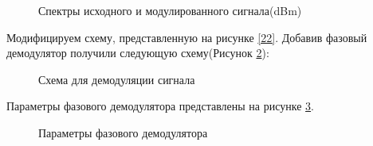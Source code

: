 \documentclass[a4paper,14pt]{extarticle}
\begin{document}
\begin{figure}[H]
\caption{Спектры исходного и модулированного сигнала(dBm)}
\label{26}
\end{figure}

Модифицируем схему, представленную на рисунке \ref{22}. Добавив фазовый демодулятор получили следующую схему(Рисунок  \ref{27}):

\begin{figure}[H]
\caption{Схема для демодуляции сигнала}
\label{27}
\end{figure}

Параметры фазового демодулятора представлены на рисунке \ref{28}.

\begin{figure}[H]
\caption{Параметры фазового демодулятора}
\label{28}
\end{figure}
\end{document}
